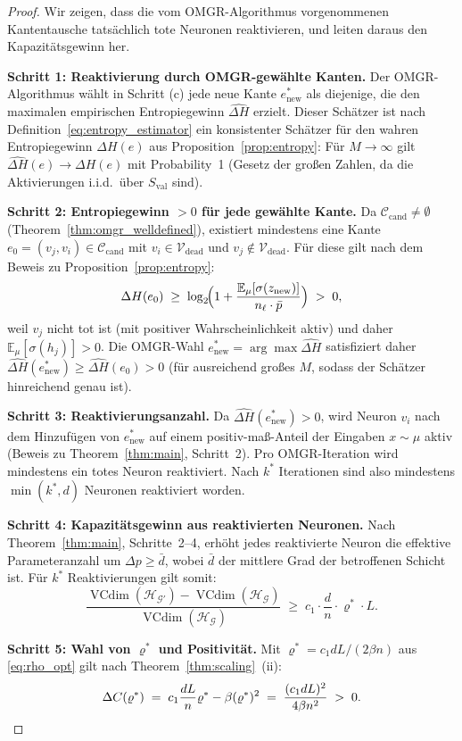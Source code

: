 \documentclass[12pt, a4paper, openany]{report}
\newcommand{\E}{\mathbb{E}}
\newcommand{\calG}{\mathcal{G}}
\newcommand{\calH}{\mathcal{H}}
\newcommand{\calV}{\mathcal{V}}
\newcommand{\calC}{\mathcal{C}}
\DeclareMathOperator{\VC}{VCdim}
\begin{document}
\begin{proof}
Wir zeigen, dass die vom OMGR-Algorithmus vorgenommenen Kantentausche
tatsächlich tote Neuronen reaktivieren, und leiten daraus den
Kapazitätsgewinn her.

\textbf{Schritt 1: Reaktivierung durch OMGR-gewählte Kanten.}
Der OMGR-Algo\-rithmus wählt in Schritt (c) jede neue Kante $e_{\mathrm{new}}^*$
als diejenige, die den maximalen empirischen Entropiegewinn $\widehat{\Delta H}$
erzielt.  Dieser Schätzer ist nach Definition~\eqref{eq:entropy_estimator}
ein konsistenter Schätzer für den wahren Entropiegewinn $\Delta H(e)$
aus Proposition~\ref{prop:entropy}: Für $M \to \infty$ gilt
$\widehat{\Delta H}(e) \to \Delta H(e)$ mit Probability~1 (Gesetz der
großen Zahlen, da die Aktivierungen i.i.d.\ über $S_{\mathrm{val}}$ sind).

\textbf{Schritt 2: Entropiegewinn $>0$ für jede gewählte Kante.}
Da $\calC_{\mathrm{cand}} \neq \emptyset$ (Theorem~\ref{thm:omgr_welldefined}),
existiert mindestens eine Kante $e_0 = (v_j, v_i) \in \calC_{\mathrm{cand}}$
mit $v_i \in \calV_{\mathrm{dead}}$ und $v_j \notin \calV_{\mathrm{dead}}$.
Für diese gilt nach dem Beweis zu Proposition~\ref{prop:entropy}:
\[
  \Delta H(e_0) \;\geq\;
  \log_2\!\Bigl(1 + \frac{\E_\mu[\sigma(z_{\mathrm{new}})]}{n_\ell \cdot \bar p}\Bigr)
  \;>\; 0,
\]
weil $v_j$ nicht tot ist (mit positiver Wahrscheinlichkeit aktiv) und
daher $\E_\mu[\sigma(h_j)] > 0$.  Die OMGR-Wahl $e_{\mathrm{new}}^* = \arg\max \widehat{\Delta H}$
satisfiziert daher $\widehat{\Delta H}(e_{\mathrm{new}}^*) \geq \widehat{\Delta H}(e_0) > 0$
(für ausreichend großes $M$, sodass der Schätzer hinreichend genau ist).

\textbf{Schritt 3: Reaktivierungsanzahl.}
Da $\widehat{\Delta H}(e_{\mathrm{new}}^*) > 0$, wird Neuron $v_i$ nach dem
Hinzufügen von $e_{\mathrm{new}}^*$ auf einem positiv-maß-Anteil der
Eingaben $x \sim \mu$ aktiv (Beweis zu Theorem~\ref{thm:main}, Schritt~2).
Pro OMGR-Iteration wird mindestens ein totes Neuron reaktiviert.
Nach $k^*$ Iterationen sind also mindestens $\min(k^*, d)$ Neuronen
reaktiviert worden.

\textbf{Schritt 4: Kapazitätsgewinn aus reaktivierten Neuronen.}
Nach Theorem~\ref{thm:main}, Schritte~2--4, erhöht jedes reaktivierte
Neuron die effektive Parameteranzahl um $\Delta p \geq \bar{d}$,
wobei $\bar{d}$ der mittlere Grad der betroffenen Schicht ist.
Für $k^*$ Reaktivierungen gilt somit:
\[
  \frac{\VC(\calH_{\calG'}) - \VC(\calH_{\calG})}{\VC(\calH_{\calG})}
  \;\geq\;
  c_1 \cdot \frac{d}{n} \cdot \varrho^* \cdot L.
\]

\textbf{Schritt 5: Wahl von $\varrho^*$ und Positivität.}
Mit $\varrho^* = c_1 d L / (2\beta n)$ aus \eqref{eq:rho_opt} gilt nach
Theorem~\ref{thm:scaling}~(ii):
\[
  \Delta C(\varrho^*) \;=\;
  c_1 \frac{dL}{n} \varrho^* - \beta (\varrho^*)^2
  \;=\; \frac{(c_1 dL)^2}{4\beta n^2} \;>\; 0. \qedhere
\]
\end{proof}
\end{document}
